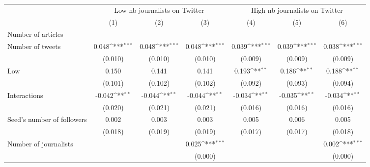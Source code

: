 {
\def\sym#1{\ifmmode^{#1}\else\(^{#1}\)\fi}
\begin{tabular}{l*{6}{c}}
\hline\hline
                    &\multicolumn{3}{c}{Low nb journalists on Twitter}                &\multicolumn{3}{c}{High nb journalists on Twitter}               \\\cmidrule(lr){2-4}\cmidrule(lr){5-7}
                    &\multicolumn{1}{c}{(1)}         &\multicolumn{1}{c}{(2)}         &\multicolumn{1}{c}{(3)}         &\multicolumn{1}{c}{(4)}         &\multicolumn{1}{c}{(5)}         &\multicolumn{1}{c}{(6)}         \\
\hline
Number of articles  &                     &                     &                     &                     &                     &                     \\
Number of tweets    &       0.048\sym{***}&       0.048\sym{***}&       0.048\sym{***}&       0.039\sym{***}&       0.039\sym{***}&       0.038\sym{***}\\
                    &     (0.010)         &     (0.010)         &     (0.010)         &     (0.009)         &     (0.009)         &     (0.009)         \\
Low                 &       0.150         &       0.141         &       0.141         &       0.193\sym{**} &       0.186\sym{**} &       0.188\sym{**} \\
                    &     (0.101)         &     (0.102)         &     (0.102)         &     (0.092)         &     (0.093)         &     (0.094)         \\
Interactions        &      -0.042\sym{**} &      -0.044\sym{**} &      -0.044\sym{**} &      -0.034\sym{**} &      -0.035\sym{**} &      -0.034\sym{**} \\
                    &     (0.020)         &     (0.021)         &     (0.021)         &     (0.016)         &     (0.016)         &     (0.016)         \\
Seed's number of followers&       0.002         &       0.003         &       0.003         &       0.005         &       0.006         &       0.005         \\
                    &     (0.018)         &     (0.019)         &     (0.019)         &     (0.017)         &     (0.017)         &     (0.018)         \\
Number of journalists&                     &                     &       0.025\sym{***}&                     &                     &       0.002\sym{***}\\
                    &                     &                     &     (0.000)         &                     &                     &     (0.000)         \\

\end{tabular}}
